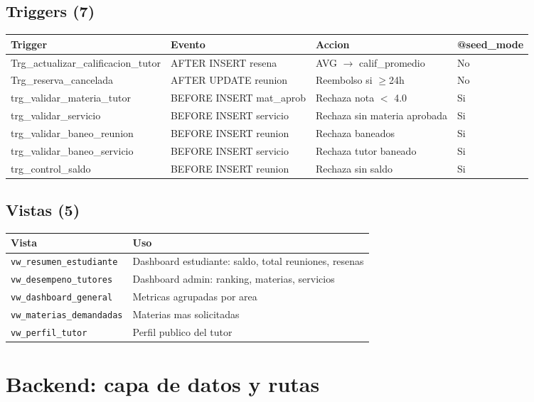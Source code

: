 \documentclass[10pt,a4paper]{article}
\begin{document}
\subsection{Triggers (7)}
\begin{longtable}{llp{5cm}l}
\toprule
\textbf{Trigger} & \textbf{Evento} & \textbf{Accion} & \textbf{@seed\_mode} \\
\midrule
Trg\_actualizar\_calificacion\_tutor & AFTER INSERT resena & AVG $\rightarrow$ calif\_promedio & No \\
Trg\_reserva\_cancelada & AFTER UPDATE reunion & Reembolso si $\geq$24h & No \\
trg\_validar\_materia\_tutor & BEFORE INSERT mat\_aprob & Rechaza nota $<$ 4.0 & Si \\
trg\_validar\_servicio & BEFORE INSERT servicio & Rechaza sin materia aprobada & Si \\
trg\_validar\_baneo\_reunion & BEFORE INSERT reunion & Rechaza baneados & Si \\
trg\_validar\_baneo\_servicio & BEFORE INSERT servicio & Rechaza tutor baneado & Si \\
trg\_control\_saldo & BEFORE INSERT reunion & Rechaza sin saldo & Si \\
\bottomrule
\end{longtable}

\subsection{Vistas (5)}
\begin{longtable}{lp{7cm}}
\toprule
\textbf{Vista} & \textbf{Uso} \\
\midrule
\texttt{vw\_resumen\_estudiante} & Dashboard estudiante: saldo, total reuniones, resenas \\
\texttt{vw\_desempeno\_tutores} & Dashboard admin: ranking, materias, servicios \\
\texttt{vw\_dashboard\_general} & Metricas agrupadas por area \\
\texttt{vw\_materias\_demandadas} & Materias mas solicitadas \\
\texttt{vw\_perfil\_tutor} & Perfil publico del tutor \\
\bottomrule
\end{longtable}

\section{Backend: capa de datos y rutas}
\end{document}
